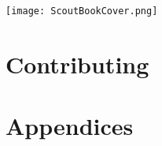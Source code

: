 \documentclass[a4paper,10pt,twoside]{book}
\begin{document}
\ifpdf
  
\else
  \texttt{[image: ScoutBookCover.png]}
\fi

\thispagestyle{empty}
\frontmatter




\pagestyle{plain}

\tableofcontents
\sloppy


\mainmatter


\pagestyle{headings}







\part{Contributing}





\appendix

\part{Appendices}

\end{document}
